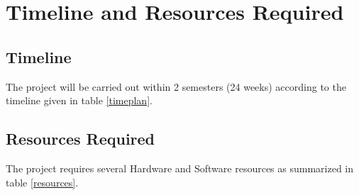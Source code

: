 \chapter{Timeline and Resources Required}

\section{Timeline}
The project will be carried out within 2 semesters (24 weeks) according to the timeline given in table \ref{timeplan}.

\section{Resources Required}
The project requires several Hardware and Software resources as summarized in table \ref{resources}.

